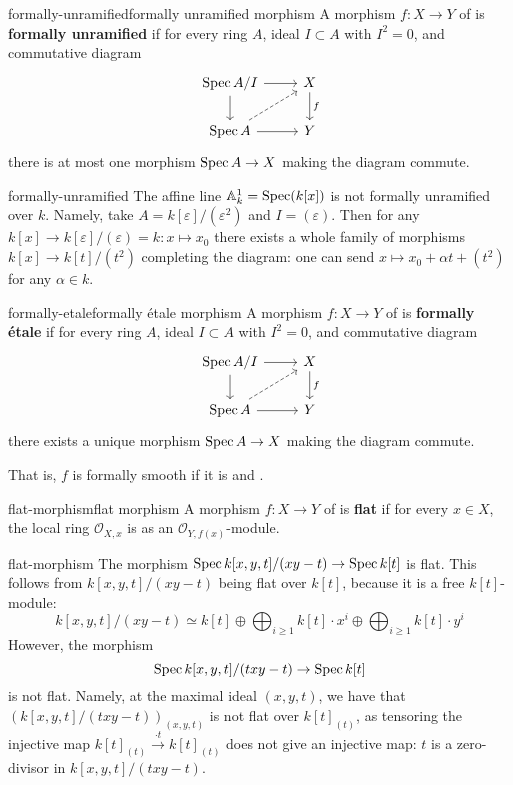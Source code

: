 \begin{topic}{formally-unramified}{formally unramified morphism}
    A morphism $f : X \to Y$ of  is \textbf{formally unramified} if for every ring $A$, ideal $I \subset A$ with $I^2 = 0$, and commutative diagram
    \[ \begin{tikzcd} \Spec A/I \arrow{r} \arrow{d} & X \arrow{d}{f} \\ \Spec A \arrow{r} \arrow[dashed]{ur} & Y \end{tikzcd} \]
    there is at most one morphism $\operatorname{Spec} A \to X$ making the diagram commute.
\end{topic}

\begin{example}{formally-unramified}
    The affine line $\mathbb{A}^1_k = \operatorname{Spec}(k[x])$ is not formally unramified over $k$. Namely, take $A = k[\varepsilon] / (\varepsilon^2)$ and $I = (\varepsilon)$. Then for any $k[x] \to k[\varepsilon]/(\varepsilon) = k : x \mapsto x_0$ there exists a whole family of morphisms $k[x] \to k[t]/(t^2)$ completing the diagram: one can send $x \mapsto x_0 + \alpha t + (t^2)$ for any $\alpha \in k$.
\end{example}

\begin{topic}{formally-etale}{formally étale morphism}
    A morphism $f : X \to Y$ of  is \textbf{formally étale} if for every ring $A$, ideal $I \subset A$ with $I^2 = 0$, and commutative diagram
    \[ \begin{tikzcd} \Spec A/I \arrow{r} \arrow{d} & X \arrow{d}{f} \\ \Spec A \arrow{r} \arrow[dashed]{ur} & Y \end{tikzcd} \]
    there exists a unique morphism $\operatorname{Spec} A \to X$ making the diagram commute.
    
    That is, $f$ is formally smooth if it is  and .
\end{topic}

\begin{topic}{flat-morphism}{flat morphism}
    A morphism $f : X \to Y$ of  is \textbf{flat} if for every $x \in X$, the local ring $\mathcal{O}_{X, x}$ is  as an $\mathcal{O}_{Y, f(x)}$-module.
\end{topic}

\begin{example}{flat-morphism}
    The morphism $\operatorname{Spec} k[x, y, t] / (xy - t) \to \operatorname{Spec} k[t]$ is flat. This follows from $k[x, y, t] / (xy - t)$ being flat over $k[t]$, because it is a free $k[t]$-module:
    \[ k[x, y, t] / (xy - t) \simeq k[t] \oplus \bigoplus_{i \ge 1} k[t] \cdot x^i \oplus \bigoplus_{i \ge 1} k[t] \cdot y^i \]
    However, the morphism
    \[ \operatorname{Spec} k[x, y, t] / (txy - t) \to \operatorname{Spec} k[t] \]
    is not flat. Namely, at the maximal ideal $(x, y, t)$, we have that $(k[x, y, t] / (txy - t))_{(x, y, t)}$ is not flat over $k[t]_{(t)}$, as tensoring the injective map $k[t]_{(t)} \xrightarrow{\cdot t} k[t]_{(t)}$ does not give an injective map: $t$ is a zero-divisor in $k[x, y, t] / (txy - t)$.
\end{example}

